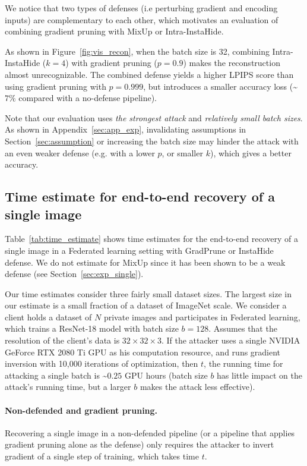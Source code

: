 We notice that two types of defenses (i.e perturbing gradient and encoding inputs) are complementary to each other, which motivates an evaluation of combining gradient pruning with MixUp or  Intra-InstaHide.

As shown in Figure~\ref{fig:vis_recon}, when the batch size is 32, combining  Intra-InstaHide ($k=4$) with gradient pruning ($p=0.9$) makes the reconstruction almost unrecognizable. The combined defense yields a higher LPIPS score than using gradient pruning with $p=0.999$, but introduces a smaller accuracy loss (\textasciitilde$7\%$ compared with a no-defense pipeline). 

Note that our evaluation uses {\em the strongest attack} and {\em relatively small batch sizes}. As shown in Appendix~\ref{sec:app_exp}, invalidating assumptions in Section~\ref{sec:assumption} or increasing the batch size may hinder the attack with an even weaker defense (e.g. with a lower $p$, or smaller $k$), which gives a better accuracy. 


\subsection{Time estimate for end-to-end recovery of a single image}
\label{sec:exp_estimate}

Table~\ref{tab:time_estimate} shows time estimates for the end-to-end recovery of a single image in a Federated learning setting with GradPrune or InstaHide defense.  
We do not estimate for MixUp since it has been shown to be a weak defense (see Section~\ref{sec:exp_single}). %

Our time estimates consider three fairly small dataset sizes.  The largest size in our estimate is a small fraction of a dataset of ImageNet scale.  We consider a client holds a dataset of $N$ private images and participates in Federated learning, which trains a ResNet-18 model with batch size $b=128$. Assumes that the resolution of the client's data is $32\times 32 \times 3$. If the attacker uses a single NVIDIA GeForce RTX 2080 Ti GPU as his computation resource, and runs gradient inversion with 10,000 iterations of optimization,  then $t$, the running time for attacking a single batch is \textasciitilde$0.25$ GPU hours (batch size $b$ has little impact on the attack's running time, but a larger $b$ makes the attack less effective).


\paragraph{Non-defended and gradient pruning.} Recovering a single image in a non-defended pipeline (or a pipeline that applies gradient pruning alone as the defense) only requires the attacker to invert gradient of a single step of training, which takes time $t$. 


